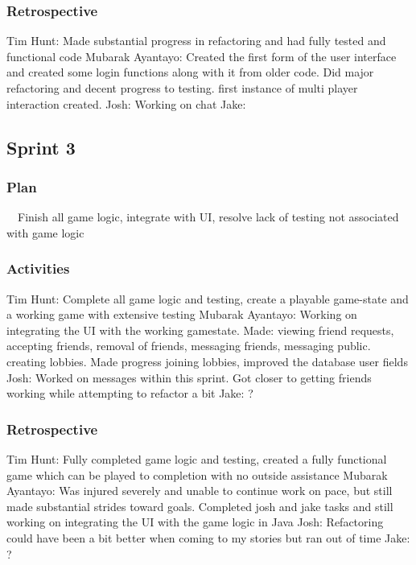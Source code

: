 \documentclass[12pt]{article}
\begin{document}
\subsubsection{Retrospective}
Tim Hunt: Made substantial progress in refactoring and had fully tested and functional code \newline
Mubarak Ayantayo: Created the first form of the user interface and created some login functions along with it from older code. Did major refactoring and decent progress to testing. first instance of multi player interaction created. \newline
Josh: Working on chat \newline
Jake:
\subsection{Sprint 3}
\subsubsection{Plan}
\ \ Finish all game logic, integrate with UI, resolve lack of testing not associated with game logic
\subsubsection{Activities}
Tim Hunt: Complete all game logic and testing, create a playable game-state and a working game with extensive testing \newline
 Mubarak Ayantayo: Working on integrating the UI with the working gamestate. Made: viewing friend requests, accepting friends, removal of friends, messaging friends, messaging public. creating lobbies. Made progress  joining lobbies, improved the database user fields \newline
Josh: Worked on messages within this sprint. Got closer to getting friends working while attempting to refactor a bit \newline
Jake: ?
\subsubsection{Retrospective}
Tim Hunt: Fully completed game  logic and testing, created a fully functional game which can be played to completion with no outside assistance \newline
Mubarak Ayantayo: Was injured severely and unable to continue work on pace, but still made substantial strides toward goals. Completed  josh and jake tasks and still working on integrating the UI with the game logic in Java \newline
Josh: Refactoring could have been a bit better when coming to my stories but ran out of time \newline
Jake: ?
\end{document}
